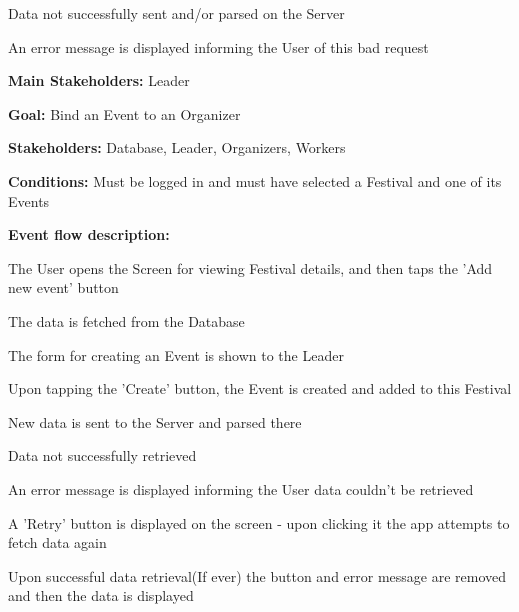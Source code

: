 \begin{packed_item}
\begin{packed_item}
					\item[4.a] Data not successfully sent and/or parsed on the Server
					\item[] \begin{packed_enum}
						\item An error message is displayed informing the User of this bad request
					\end{packed_enum}
				\end{packed_item}
				
			\end{packed_item}
			
			\noindent {}
			\begin{packed_item}
				\item \textbf{Main Stakeholders:} Leader
				\item \textbf{Goal:} Bind an Event to an Organizer
				\item \textbf{Stakeholders: } Database, Leader, Organizers, Workers
				\item \textbf{Conditions: } Must be logged in and must have selected a Festival and one of its Events
				\item \textbf{Event flow description: }
				\begin{packed_enum}
					\item The User opens the Screen for viewing Festival details, and then taps the 'Add new event' button
					\item The data is fetched from the Database
					\item The form for creating an Event is shown to the Leader
					\item Upon tapping the 'Create' button, the Event is created and added to this Festival
					\item New data is sent to the Server and parsed there
				\end{packed_enum}
				
				\begin{packed_item}
					
					\item[1.a] Data not successfully retrieved
					\item[] \begin{packed_enum}
						\item An error message is displayed informing the User data couldn't be retrieved
						\item A 'Retry' button is displayed on the screen - upon clicking it the app attempts to fetch data again
						\item Upon successful data retrieval(If ever) the button and error message are removed and then the data is displayed
					\end{packed_enum}
					

\end{packed_item}
\end{packed_item}
